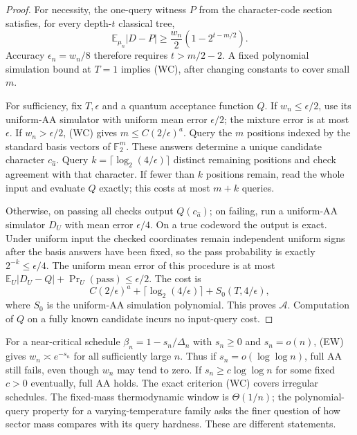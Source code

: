 \begin{proof}
For necessity, the one-query witness $P$ from the character-code
section satisfies, for every depth-$t$ classical tree,
\[
 \mathbb E_{\mu_n}|D-P|
 \ge\frac{w_n}{2}(1-2^{t-m/2}).
\]
Accuracy $\epsilon_n=w_n/8$ therefore requires
$t>m/2-2$.  A fixed polynomial simulation bound at $T=1$ implies (WC),
after changing constants to cover small $m$.

For sufficiency, fix $T,\epsilon$ and a quantum acceptance function $Q$.
If $w_n\le\epsilon/2$, use its uniform-AA simulator with uniform
mean error $\epsilon/2$; the mixture error is at most $\epsilon$.
If $w_n>\epsilon/2$, (WC) gives
$m\le C(2/\epsilon)^a$.  Query the $m$ positions indexed by the
standard basis vectors of $\mathbb F_2^m$.  These answers determine
a unique candidate character $c_{\widehat a}$.  Query
$k=\lceil\log_2(4/\epsilon)\rceil$ distinct remaining positions and
check agreement with that character.  If fewer than $k$ positions
remain, read the whole input and evaluate $Q$ exactly; this costs at
most $m+k$ queries.

Otherwise, on passing all checks output $Q(c_{\widehat a})$; on
failing, run a uniform-AA simulator $D_U$ with mean error
$\epsilon/4$.  On a true codeword the output is exact.  Under uniform
input the checked coordinates remain independent uniform signs after
the basis answers have been fixed, so the pass probability is exactly
$2^{-k}\le\epsilon/4$.  The uniform mean error of this procedure is
at most
$\mathbb E_U|D_U-Q|+\Pr_U(\mathrm{pass})\le\epsilon/2$.
The cost is
\[
 C(2/\epsilon)^a+\lceil\log_2(4/\epsilon)\rceil
 +S_0(T,4/\epsilon),
\]
where $S_0$ is the uniform-AA simulation polynomial.  This proves
$\mathcal A$.  Computation of $Q$ on a fully known candidate incurs
no input-query cost.
\end{proof}

For a near-critical schedule
$\beta_n=1-s_n/\Delta_n$ with $s_n\ge0$ and $s_n=o(n)$,
(EW) gives $w_n\asymp e^{-s_n}$ for all sufficiently large $n$.
Thus if $s_n=o(\log\log n)$, full AA still fails, even though $w_n$
may tend to zero.  If $s_n\ge c\log\log n$ for some fixed $c>0$
eventually, full AA holds.  The exact criterion (WC) covers irregular
schedules.  The fixed-mass thermodynamic window is $\Theta(1/n)$;
the polynomial-query property for a varying-temperature family asks
the finer question of how sector mass compares with its query
hardness.  These are different statements.
